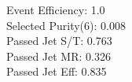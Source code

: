 Event Efficiency:   1.0\\ 
Selected Purity(6): 0.008\\ 
Passed Jet S/T:     0.763\\ 
Passed Jet MR:      0.326\\ 
Passed Jet Eff:     0.835
